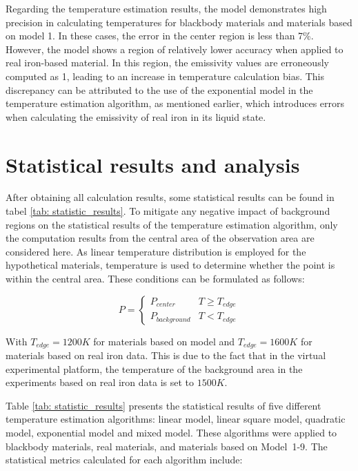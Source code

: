 Regarding the temperature estimation results, the model demonstrates high 
precision in calculating temperatures for blackbody materials and materials 
based on model 1. In these cases, the error in the center region is less than 7\%. 
However, the model shows a region of relatively lower accuracy when 
applied to real iron-based material. In this region, the emissivity values 
are erroneously computed as 1, leading to an increase in temperature 
calculation bias. This discrepancy can be attributed to the use of the 
exponential model in the temperature estimation algorithm, as mentioned 
earlier, which introduces errors when calculating the emissivity 
of real iron in its liquid state.


\section{Statistical results and analysis}

After obtaining all calculation results, some statistical results can be found in 
tabel \ref{tab: statistic_results}. To mitigate any negative impact of background 
regions on the statistical results of the temperature estimation algorithm, 
only the computation results from the central area of the observation 
area are considered here. As linear temperature distribution 
is employed for the hypothetical materials, temperature is used to determine 
whether the point is within 
the central area. These conditions can be formulated as follows:


\begin{equation}
    P = \begin{cases}
        P_{center}  & T \geq T_{edge} \\
        P_{background}  & T < T_{edge}
    \end{cases}
    \label{eq: T_edge}
\end{equation}


With $T_{edge} = 1200K$ for materials based on model and $T_{edge} = 1600K$ for materials based 
on real iron data. This is due to the fact that in the virtual experimental 
platform, the temperature of the background area in the experiments based on 
real iron data is set to $1500K$.


Table \ref{tab: statistic_results} presents the statistical results of five 
different temperature estimation algorithms: linear model, linear square model, 
quadratic model, exponential model and mixed model. These algorithms were 
applied to blackbody materials, real materials, and materials based on \mbox{Model 1-9}. 
The statistical metrics calculated for each algorithm include:


